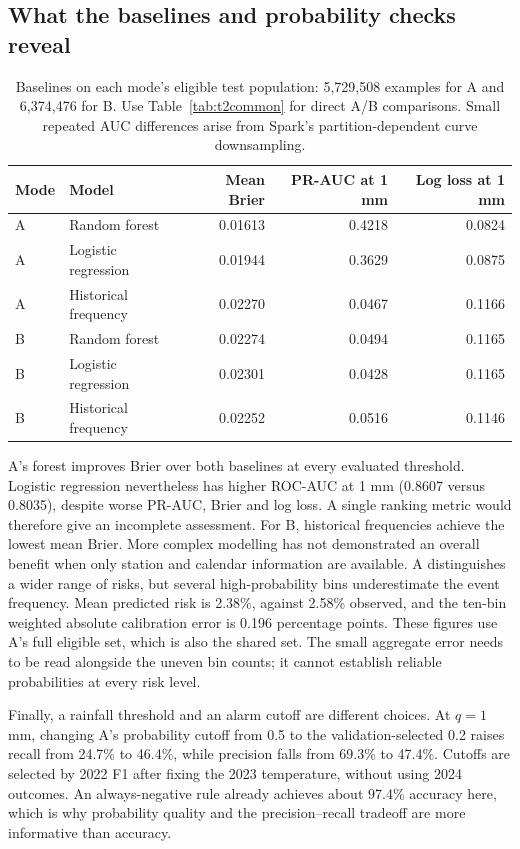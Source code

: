 \subsection{What the baselines and probability checks reveal}
\par
\begin{table}[htbp]\centering\small
\begin{tabular}{llrrr}\toprule
Mode & Model & Mean Brier & PR-AUC at 1 mm & Log loss at 1 mm\\\midrule
A & Random forest & 0.01613 & 0.4218 & 0.0824\\
A & Logistic regression & 0.01944 & 0.3629 & 0.0875\\
A & Historical frequency & 0.02270 & 0.0467 & 0.1166\\
B & Random forest & 0.02274 & 0.0494 & 0.1165\\
B & Logistic regression & 0.02301 & 0.0428 & 0.1165\\
B & Historical frequency & 0.02252 & 0.0516 & 0.1146\\\bottomrule
\end{tabular}
\caption{Baselines on each mode's eligible test population: 5,729,508 examples for A and 6,374,476 for B. Use Table~\ref{tab:t2common} for direct A/B comparisons. Small repeated AUC differences arise from Spark's partition-dependent curve downsampling.}\label{tab:t2baseline}
\end{table}
\par
A's forest improves Brier over both baselines at every evaluated threshold. Logistic regression nevertheless has higher ROC-AUC at 1 mm (0.8607 versus 0.8035), despite worse PR-AUC, Brier and log loss. A single ranking metric would therefore give an incomplete assessment. For B, historical frequencies achieve the lowest mean Brier. More complex modelling has not demonstrated an overall benefit when only station and calendar information are available.
A distinguishes a wider range of risks, but several high-probability bins underestimate the event frequency. Mean predicted risk is 2.38\%, against 2.58\% observed, and the ten-bin weighted absolute calibration error is 0.196 percentage points. These figures use A's full eligible set, which is also the shared set. The small aggregate error needs to be read alongside the uneven bin counts; it cannot establish reliable probabilities at every risk level.

Finally, a rainfall threshold and an alarm cutoff are different choices. At $q=1$ mm, changing A's probability cutoff from 0.5 to the validation-selected 0.2 raises recall from 24.7\% to 46.4\%, while precision falls from 69.3\% to 47.4\%. Cutoffs are selected by 2022 F1 after fixing the 2023 temperature, without using 2024 outcomes. An always-negative rule already achieves about 97.4\% accuracy here, which is why probability quality and the precision--recall tradeoff are more informative than accuracy.
